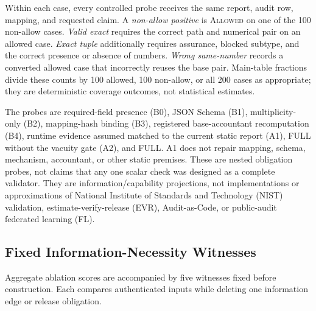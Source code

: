 \documentclass[letterpaper]{article} %
\newcommand{\Allowed}{\textsc{Allowed}}
\begin{document}
Within each case, every controlled probe receives the same report, audit row,
mapping, and requested claim.  A \emph{non-allow positive} is \Allowed{} on one of the 100 non-allow
cases.  \emph{Valid exact} requires the correct path and numerical pair on an
allowed case.  \emph{Exact tuple} additionally requires assurance, blocked
subtype, and the correct presence or absence of numbers.  \emph{Wrong
same-number} records a converted allowed case that incorrectly reuses the base
pair.  Main-table fractions divide these counts by 100 allowed, 100 non-allow,
or all 200 cases as appropriate; they are deterministic coverage outcomes,
not statistical estimates.

The probes are required-field presence (B0), JSON Schema (B1),
multiplicity-only (B2), mapping-hash binding (B3), registered base-accountant
recomputation (B4), runtime evidence assumed matched to the current static
report (A1), FULL without the vacuity gate (A2), and FULL.  A1 does not repair
mapping, schema, mechanism, accountant, or other static premises.  These are
nested obligation probes, not claims that any one scalar check was designed
as a complete validator.  They are information/capability projections, not
implementations or approximations of National Institute of Standards and
Technology (NIST) validation, estimate-verify-release (EVR), Audit-as-Code, or
public-audit federated learning (FL).

\subsection{Fixed Information-Necessity Witnesses}

Aggregate ablation scores are accompanied by five witnesses fixed before
construction.  Each compares authenticated inputs while deleting one
information edge or release obligation.
\end{document}
